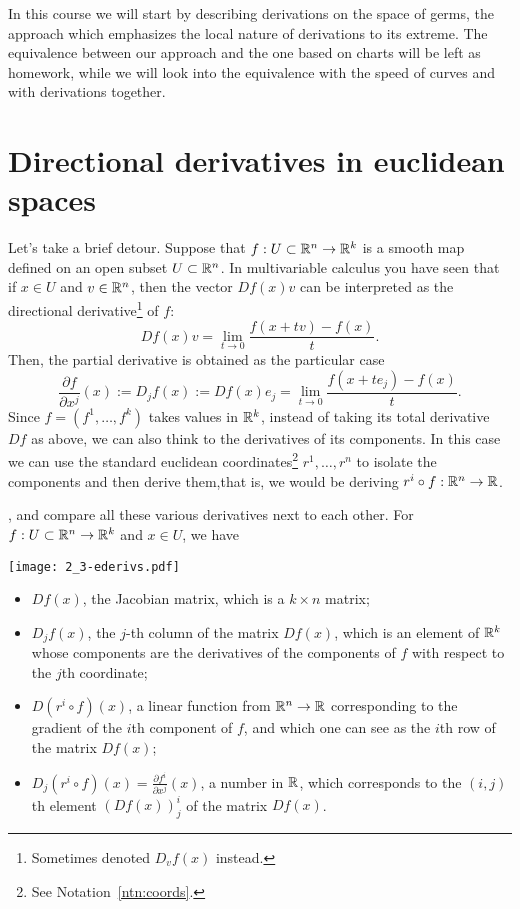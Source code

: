 In this course we will start by describing derivations on the space of germs, the approach which emphasizes the local nature of derivations to its extreme.
The equivalence between our approach and the one based on charts will be left as homework, while we will look into the equivalence with the speed of curves and with derivations together.

\section{Directional derivatives in euclidean spaces}\label{sec:dd}

Let's take a brief detour.
Suppose that $f: U\subset\mathbb{R}^n\to\mathbb{R}^k$ is a smooth map defined on an open subset $U\subset \mathbb{R}^n$.
In multivariable calculus you have seen that if $x\in U$ and $v\in\mathbb{R}^n$, then the vector $Df(x) v$ can be interpreted as the directional derivative\footnote{Sometimes denoted $D_v f(x)$ instead.} of $f$:
\begin{equation}
  Df(x) v = \lim_{t\to0}\frac{f(x+tv) - f(x)}{t}.
\end{equation}
Then, the partial derivative is obtained as the particular case
\begin{equation}
  \frac{\partial f}{\partial x^j}(x) := D_jf(x) := Df(x) e_j = \lim_{t\to0} \frac{f(x+te_j) - f(x)}{t}.
\end{equation}
Since $f=(f^1, \ldots, f^k)$ takes values in $\mathbb{R}^k$, instead of taking its total derivative $Df$ as above, we can also think to the derivatives of its components.
In this case we can use the standard euclidean coordinates\footnote{See Notation~\ref{ntn:coords}.} $r^1, \ldots, r^n$ to isolate the components and then derive them,that is, we would be deriving $r^i \circ f : \mathbb{R}^n \to \mathbb{R}$.

, and compare all these various derivatives next to each other.
For $f:U\subset\mathbb{R}^n\to\mathbb{R}^k$ and $x\in U$, we have
\begin{marginfigure}[3.5cm]
  \texttt{[image: 2\_3-ederivs.pdf]}
\end{marginfigure}
\begin{itemize}
  \item $Df(x)$, the Jacobian matrix, which is a $k\times n$ matrix;
  \item $D_j f(x)$, the $j$-th column of the matrix $Df(x)$, which is an element of $\mathbb{R}^k$ whose components are the derivatives of the components of $f$ with respect to the $j$th coordinate;
  \item $D(r^i\circ f)(x)$, a linear function from $\mathbb{R}^n \to \mathbb{R}$ corresponding to the gradient of the $i$th component of $f$, and which one can see as the $i$th row of the matrix $Df(x)$;
  \item $D_j(r^i\circ f)(x) = \frac{\partial f^i}{\partial x^j}(x)$, a number in $\mathbb{R}$, which corresponds to the $(i,j)$th element $(Df(x))_j^i$ of the matrix $Df(x)$.
\end{itemize}

